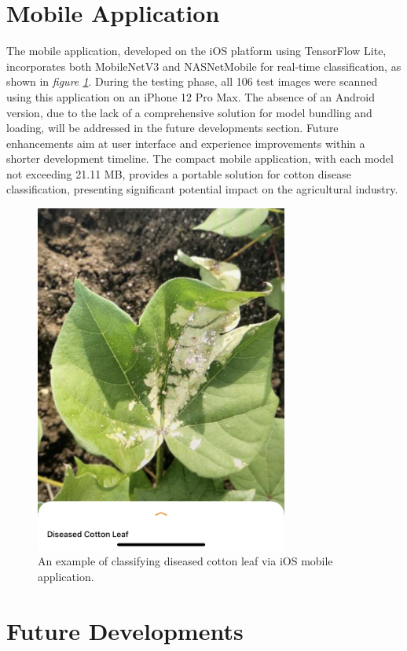 \documentclass[conference]{IEEEtran}
\begin{document}
\section{Mobile Application}

The mobile application, developed on the iOS platform using TensorFlow Lite, incorporates both MobileNetV3 and NASNetMobile for real-time classification, as shown in \emph{figure \ref{DiseasedCottonLeaf}}. During the testing phase, all 106 test images were scanned using this application on an iPhone 12 Pro Max. The absence of an Android version, due to the lack of a comprehensive solution for model bundling and loading, will be addressed in the future developments section. Future enhancements aim at user interface and experience improvements within a shorter development timeline. The compact mobile application, with each model not exceeding 21.11 MB, provides a portable solution for cotton disease classification, presenting significant potential impact on the agricultural industry.

\begin{figure}[h]
\centerline{\includegraphics[height=11.5cm, width =1\linewidth]{Images/Diseased Cotton Leaf.png}}
\caption{An example of classifying diseased cotton leaf via iOS mobile application.}
\label{DiseasedCottonLeaf}
\end{figure}

\section{Future Developments}
\end{document}
